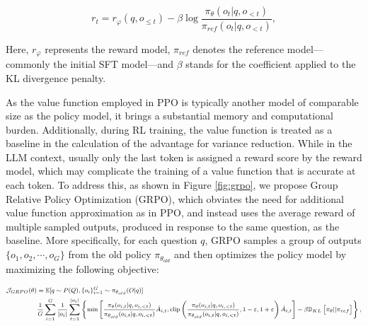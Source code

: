 \begin{itemize}[topsep=0pt]
\begin{itemize}[topsep=0pt]
\begin{equation}
    r_{t} = r_\varphi(q, o_{\le t}) - \beta \log\frac{\pi_{\theta}(o_{t}|q, o_{<t})}{\pi_{ref}(o_{t}|q, o_{<t})},
\label{eq:PPO-reward}
\end{equation}

Here, $r_\varphi$ represents the reward model, $\pi_{ref}$ denotes the reference model—commonly the initial SFT model—and $\beta$ stands for the coefficient applied to the KL divergence penalty.

As the value function employed in PPO is typically another model of comparable size as the policy model, it brings a substantial memory and computational burden. Additionally, during RL training, the value function is treated as a baseline in the calculation of the advantage for variance reduction. While in the LLM context, usually only the last token is assigned a reward score by the reward model, which may complicate the training of a value function that is accurate at each token. To address this, as shown in Figure \ref{fig:grpo}, we propose Group Relative Policy Optimization (GRPO), which obviates the need for additional value function approximation as in PPO, and instead uses the average reward of multiple sampled outputs, produced in response to the same question, as the baseline. More specifically, for each question $q$, GRPO samples a group of outputs $\{o_1, o_2, \cdots, o_G\}$  from the old policy  $\pi_{\theta_{old}}$  and then optimizes the policy model by maximizing the following objective:

\begin{equation}
\footnotesize
\begin{split}
    \mathcal{J}_{GRPO}(\theta) &= \mathbb{E}{[q \sim P(Q), \{o_i\}_{i=1}^G \sim \pi_{\theta_{old}}(O|q)]}  \\
    & \frac{1}{G}\sum_{i=1}^G\frac{1}{|o_i|} \sum_{t=1}^{|o_i|} \left\{ \min \left[ \frac{\pi_\theta(o_{i,t} | q, o_{i,<t})}{\pi_{\theta_{old}}(o_{i,t} | q, o_{i,<t})} \hat{A}_{i,t}, \text{clip} \left( \frac{\pi_\theta(o_{i,t} | q, o_{i,<t})}{\pi_{\theta_{old}}(o_{i,t} | q, o_{i,<t})}, 1 - \varepsilon, 1 + \varepsilon \right)  \hat{A}_{i,t} \right] - \beta \mathbb{D}_{KL}\left[\pi_{\theta} || \pi_{ref}\right]\right\} ,
\end{split}
\label{eq:GRPO-obj}
\end{equation}


\end{itemize}
\end{itemize}
